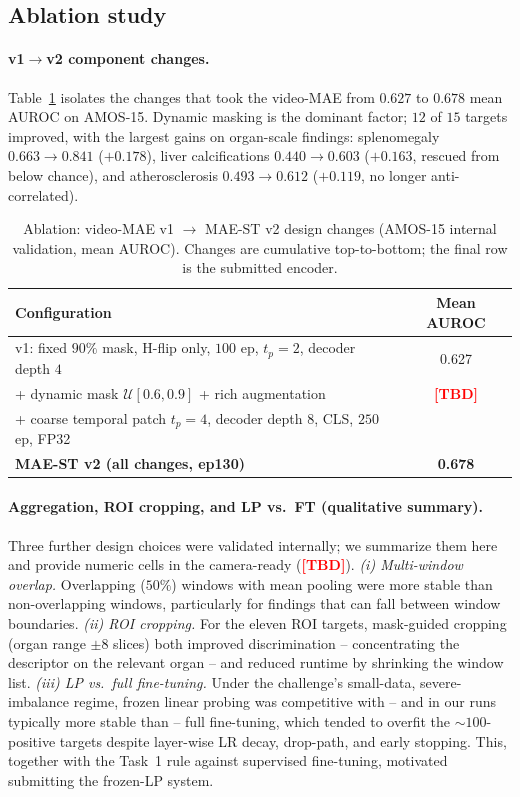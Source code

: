 \documentclass[runningheads]{llncs}
\newcommand{\tba}{\textcolor{red}{\textbf{[TBD]}}}
\begin{document}
\subsection{Ablation study}
\label{sec:ablation}

\paragraph{v1$\to$v2 component changes.}
Table~\ref{tab:ablation} isolates the changes that took the video-MAE from
$0.627$ to $0.678$ mean AUROC on AMOS-15. Dynamic masking is the dominant factor;
$12$ of $15$ targets improved, with the largest gains on organ-scale findings:
splenomegaly $0.663\!\to\!0.841$ ($+0.178$), liver calcifications
$0.440\!\to\!0.603$ ($+0.163$, rescued from below chance), and atherosclerosis
$0.493\!\to\!0.612$ ($+0.119$, no longer anti-correlated).

\begin{table}[htbp]
\caption{Ablation: video-MAE v1 $\to$ MAE-ST v2 design changes (AMOS-15 internal
validation, mean AUROC). Changes are cumulative top-to-bottom; the final row is
the submitted encoder.}\label{tab:ablation}
\centering
\begin{tabular}{lc}
\hline
Configuration & Mean AUROC \\ \hline
v1: fixed $90\%$ mask, H-flip only, $100$ ep, $t_p{=}2$, decoder depth $4$ & 0.627 \\
\;\;+ dynamic mask $\mathcal{U}[0.6,0.9]$ + rich augmentation               & \tba{} \\
\;\;+ coarse temporal patch $t_p{=}4$, decoder depth $8$, CLS, $250$ ep, FP32 & \\
\textbf{MAE-ST v2 (all changes, ep130)}                                    & \textbf{0.678} \\ \hline
\end{tabular}
\end{table}

\paragraph{Aggregation, ROI cropping, and LP vs.\ FT (qualitative summary).}
Three further design choices were validated internally; we summarize them here
and provide numeric cells in the camera-ready (\tba{}).
\emph{(i) Multi-window overlap.} Overlapping ($50\%$) windows with mean pooling
were more stable than non-overlapping windows, particularly for findings that can
fall between window boundaries.
\emph{(ii) ROI cropping.} For the eleven ROI targets, mask-guided cropping
(organ range $\pm 8$ slices) both improved discrimination -- concentrating the
descriptor on the relevant organ -- and reduced runtime by shrinking the window
list.
\emph{(iii) LP vs.\ full fine-tuning.} Under the challenge's small-data,
severe-imbalance regime, frozen linear probing was competitive with -- and in our
runs typically more stable than -- full fine-tuning, which tended to overfit the
$\sim\!100$-positive targets despite layer-wise LR decay, drop-path, and early
stopping. This, together with the Task~1 rule against supervised fine-tuning,
motivated submitting the frozen-LP system.
\end{document}
